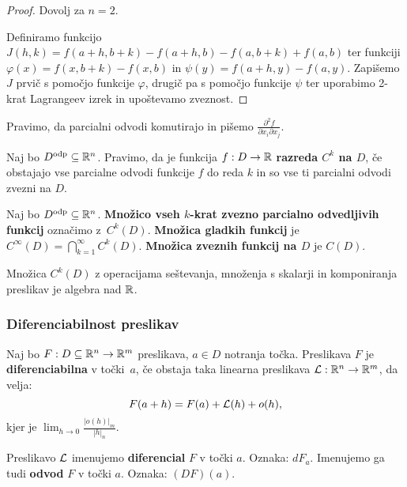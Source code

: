 \begin{proof}
    Dovolj za $n=2$. 
    
    Definiramo funkcijo $J(h, k) = f(a+h, b+k) - f(a+h, b) - f(a, b+k) + f(a,b)$ ter funkciji $\varphi(x) = f(x, b+k) - f(x, b)$ in $\psi(y) = f(a+h, y) - f(a, y)$. Zapišemo $J$ prvič s pomočjo funkcije \(\varphi\), drugič pa s pomočjo funkcije \(\psi\) ter uporabimo 2-krat Lagrangeev izrek in upoštevamo zveznost.
\end{proof}

\begin{opomba}
     Pravimo, da parcialni odvodi komutirajo in pišemo $\frac{\partial^2 f}{\partial x_i \partial x_j}$.
\end{opomba}

\begin{definicija}
    Naj bo $D^\text{odp} \subseteq \mathbb{R}^n$. Pravimo, da je funkcija $f: D \to \mathbb{R}$ \textbf{razreda $C^k$ na $D$}, če obstajajo vse parcialne odvodi funkcije $f$ do reda $k$ in so vse ti parcialni odvodi zvezni na $D$.
\end{definicija}

\begin{definicija}
    Naj bo $D^\text{odp} \subseteq \mathbb{R}^n$. \textbf{Množico vseh $k$-krat zvezno parcialno odvedljivih funkcij} označimo z~$C^k(D)$. \textbf{Množica gladkih funkcij} je $C^\infty(D) = \bigcap_{k=1}^\infty C^k(D)$. \textbf{Množica zveznih funkcij na $D$} je $C(D)$.
\end{definicija}

\begin{opomba}
    Množica $C^k(D)$ z operacijama seštevanja, množenja s skalarji in komponiranja preslikav je algebra nad $\mathbb{R}$.
\end{opomba}

\subsubsection{Diferenciabilnost preslikav}

\begin{definicija}
    Naj bo $F: D \subseteq \mathbb{R}^n \to \mathbb{R}^m$ preslikava, $a \in D$ notranja točka. Preslikava $F$ je \textbf{diferenciabilna} v točki~$a$, če obstaja taka linearna preslikava $\mathcal{L}: \mathbb{R}^n \to \mathbb{R}^m$, da velja:
    $$F(a+h) = F(a) + \mathcal{L}(h) + o(h),$$
    kjer je $\lim_{h \to 0} \frac{|o(h)|_m}{|h|_n}$. 

    Preslikavo $\mathcal{L}$ imenujemo \textbf{diferencial} $F$ v točki $a$. Oznaka: $dF_a$. Imenujemo ga tudi \textbf{odvod} $F$ v točki $a$. Oznaka: $(DF)(a)$.
\end{definicija}


